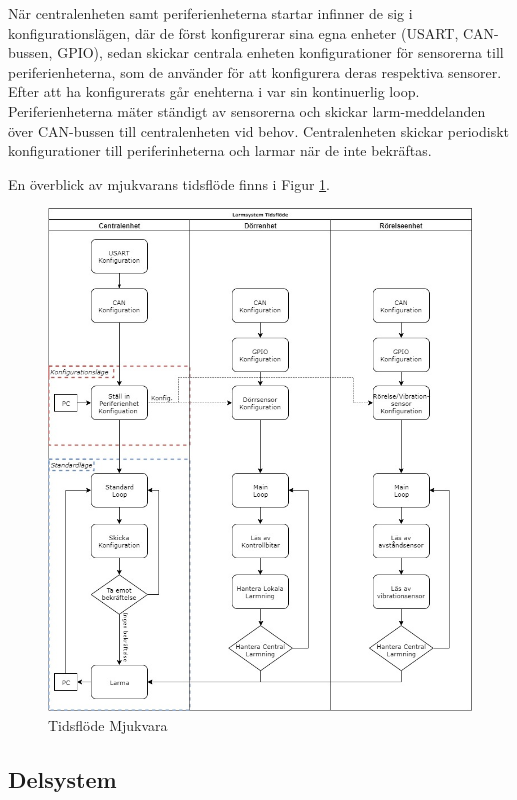 \documentclass{article}
\begin{document}
När centralenheten samt periferienheterna startar infinner de sig i konfigurationslägen, där de först konfigurerar sina egna enheter (USART, CAN-bussen, GPIO), sedan skickar centrala enheten konfigurationer för sensorerna till periferienheterna, som de använder för att konfigurera deras respektiva sensorer. Efter att ha konfigurerats går enehterna i var sin kontinuerlig loop. Periferienheterna mäter ständigt av sensorerna och skickar larm-meddelanden över CAN-bussen till centralenheten vid behov. Centralenheten skickar periodiskt konfigurationer till periferinheterna och larmar när de inte bekräftas.

En överblick av mjukvarans tidsflöde finns i Figur \ref{fig:tidsflöde}.

\begin{figure}[H]
    \centering
    \includegraphics[width=1\textwidth]{figurer/TidsFlode.jpg}
    \caption{Tidsflöde Mjukvara}
    \label{fig:tidsflöde}
\end{figure}

\subsection{Delsystem }
\end{document}
